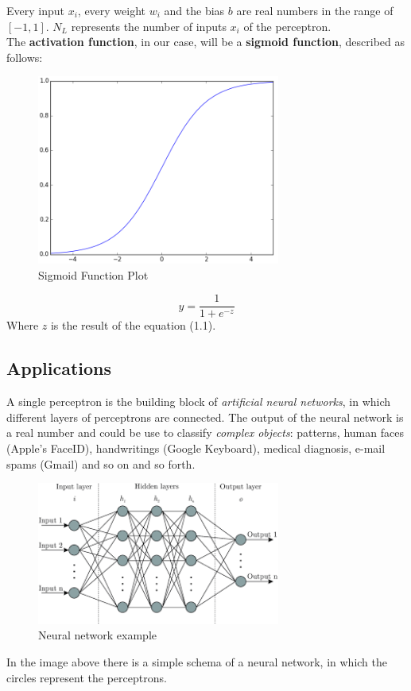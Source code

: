 Every input $x_{i}$, every weight $w_{i}$ and the bias $b$ are real numbers in the range of $[-1, 1]$. $N_{L}$ represents the number of inputs $x_{i}$ of the perceptron.\\
The \textbf{activation function}, in our case, will be a \textbf{sigmoid function}, described as follows:
\begin{figure}[h]
	\centering
	\caption{Sigmoid Function Plot}
	\includegraphics[width=8cm]{img/sigmoid.png}
\end{figure}
\begin{equation}
	y = \dfrac{1}{1+e^{-z}}
\end{equation}
Where $z$ is the result of the equation (1.1).
\subsection{Applications}
A single perceptron is the building block of \textit{artificial neural networks}, in which different layers of perceptrons are connected. The output of the neural network is a real number and could be use to classify \textit{complex objects}: patterns, human faces (Apple's FaceID), handwritings (Google Keyboard), medical diagnosis, e-mail spams (Gmail) and so on and so forth.\\
\begin{figure}[H]
	\centering
	\caption{Neural network example}
	\includegraphics[width=8cm]{img/neural_network.png}
\end{figure}
In the image above there is a simple schema of a neural network, in which the circles represent the perceptrons.
